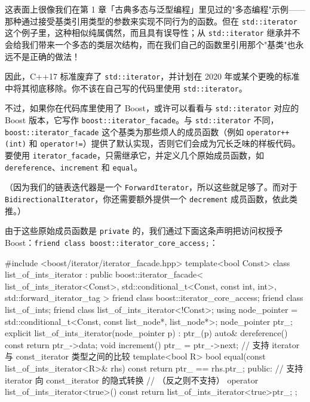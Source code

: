 这表面上很像我们在第 1 章「古典多态与泛型编程」里见过的"多态编程"示例——那种通过接受基类引用类型的参数来实现不同行为的函数。但在 \texttt{std::\allowbreak{}iterator} 这个例子里，这种相似纯属偶然，而且具有误导性；从 \texttt{std::\allowbreak{}iterator} 继承并不会给我们带来一个多态的类层次结构，而在我们自己的函数里引用那个"基类"也永远不是正确的做法！

因此，C++17 标准废弃了 \texttt{std::\allowbreak{}iterator}，并计划在 2020 年或某个更晚的标准中将其彻底移除。你不该在自己写的代码里使用 \texttt{std::\allowbreak{}iterator}。

不过，如果你在代码库里使用了 Boost，或许可以看看与 \texttt{std::\allowbreak{}iterator} 对应的 Boost 版本，它写作 \texttt{boost::\allowbreak{}iterator\_\allowbreak{}facade}。与 \texttt{std::\allowbreak{}iterator} 不同，\texttt{boost::\allowbreak{}iterator\_\allowbreak{}facade} 这个基类为那些烦人的成员函数（例如 \texttt{operator++(\allowbreak{}int)\allowbreak{}} 和 \texttt{operator!=}）提供了默认实现，否则它们会成为冗长乏味的样板代码。要使用 \texttt{iterator\_\allowbreak{}facade}，只需继承它，并定义几个原始成员函数，如 \texttt{dereference}、\texttt{increment} 和 \texttt{equal}。

（因为我们的链表迭代器是一个 \texttt{Forward\allowbreak{}Iterator}，所以这些就足够了。而对于 \texttt{Bidirectional\allowbreak{}Iterator}，你还需要额外提供一个 \texttt{decrement} 成员函数，依此类推。）

由于这些原始成员函数是 \texttt{private} 的，我们通过下面这条声明把访问权授予 Boost：\texttt{friend class boost::\allowbreak{}iterator\_\allowbreak{}core\_\allowbreak{}access;}：

\begin{codebox}[cpp]
    #include <boost/iterator/iterator_facade.hpp>
    template<bool Const>
    class list_of_ints_iterator : public boost::iterator_facade<
      list_of_ints_iterator<Const>,
      std::conditional_t<Const, const int, int>,
      std::forward_iterator_tag
    >
    {
      friend class boost::iterator_core_access;
      friend class list_of_ints;
      friend class list_of_ints_iterator<!Const>;
      using node_pointer = std::conditional_t<Const, const list_node*,
        list_node*>;
      node_pointer ptr_;
      explicit list_of_ints_iterator(node_pointer p) : ptr_(p) {}
      auto& dereference() const { return ptr_->data; }
      void increment() { ptr_ = ptr_->next; }
      // 支持 iterator 与 const_iterator 类型之间的比较
      template<bool R>
      bool equal(const list_of_ints_iterator<R>& rhs) const {
        return ptr_ == rhs.ptr_;}
    public:
      // 支持 iterator 向 const_iterator 的隐式转换
      // （反之则不支持）
      operator list_of_ints_iterator<true>() const { return
        list_of_ints_iterator<true>{ptr_}; }
    };
\end{codebox}

